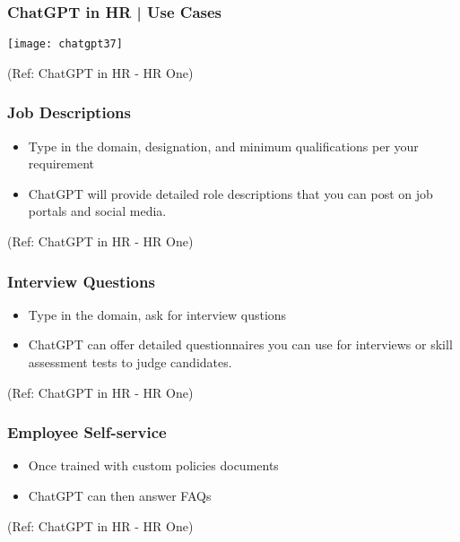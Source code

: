 
\begin{frame}[fragile]\frametitle{ChatGPT in HR | Use Cases}


\begin{center}
\texttt{[image: chatgpt37]}

\tiny{(Ref: ChatGPT in HR - HR One)}

\end{center}


\end{frame}


\begin{frame}[fragile]\frametitle{Job Descriptions}

\begin{itemize}
\item Type in the domain, designation, and minimum qualifications per your requirement
\item ChatGPT will provide detailed role descriptions that you can post on job portals and social media.
\end{itemize}


\tiny{(Ref: ChatGPT in HR - HR One)}



\end{frame}

\begin{frame}[fragile]\frametitle{Interview Questions}

\begin{itemize}
\item Type in the domain, ask for interview qustions
\item ChatGPT can offer detailed questionnaires you can use for interviews or skill assessment tests to judge candidates.
\end{itemize}

\tiny{(Ref: ChatGPT in HR - HR One)}

\end{frame}


\begin{frame}[fragile]\frametitle{Employee Self-service}

\begin{itemize}
\item Once trained with custom policies documents
\item ChatGPT can then answer FAQs
\end{itemize}

\tiny{(Ref: ChatGPT in HR - HR One)}

\end{frame}

